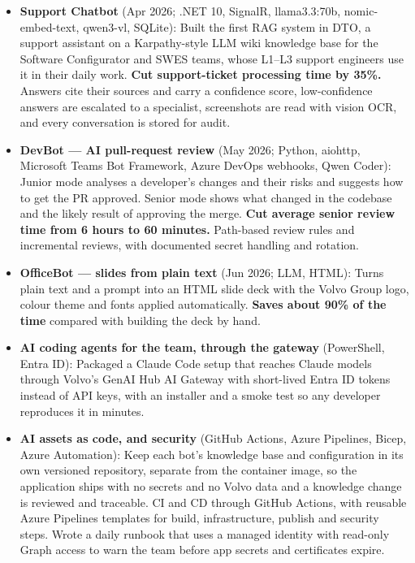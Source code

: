 \documentclass[a4paper,10pt]{article}
\begin{document}
\begin{itemize}
  \item \textbf{Support Chatbot} (Apr 2026; .NET 10, SignalR, llama3.3:70b, nomic-embed-text, qwen3-vl, SQLite): Built the first RAG system in DTO, a support assistant on a Karpathy-style LLM wiki knowledge base for the Software Configurator and SWES teams, whose L1--L3 support engineers use it in their daily work. \textbf{Cut support-ticket processing time by 35\%.} Answers cite their sources and carry a confidence score, low-confidence answers are escalated to a specialist, screenshots are read with vision OCR, and every conversation is stored for audit.

  \item \textbf{DevBot --- AI pull-request review} (May 2026; Python, aiohttp, Microsoft Teams Bot Framework, Azure DevOps webhooks, Qwen Coder): Junior mode analyses a developer's changes and their risks and suggests how to get the PR approved. Senior mode shows what changed in the codebase and the likely result of approving the merge. \textbf{Cut average senior review time from 6 hours to 60 minutes.} Path-based review rules and incremental reviews, with documented secret handling and rotation.

  \item \textbf{OfficeBot --- slides from plain text} (Jun 2026; LLM, HTML): Turns plain text and a prompt into an HTML slide deck with the Volvo Group logo, colour theme and fonts applied automatically. \textbf{Saves about 90\% of the time} compared with building the deck by hand.

  \item \textbf{AI coding agents for the team, through the gateway} (PowerShell, Entra ID): Packaged a Claude Code setup that reaches Claude models through Volvo's GenAI Hub AI Gateway with short-lived Entra ID tokens instead of API keys, with an installer and a smoke test so any developer reproduces it in minutes.

  \item \textbf{AI assets as code, and security} (GitHub Actions, Azure Pipelines, Bicep, Azure Automation): Keep each bot's knowledge base and configuration in its own versioned repository, separate from the container image, so the application ships with no secrets and no Volvo data and a knowledge change is reviewed and traceable. CI and CD through GitHub Actions, with reusable Azure Pipelines templates for build, infrastructure, publish and security steps. Wrote a daily runbook that uses a managed identity with read-only Graph access to warn the team before app secrets and certificates expire.


\end{itemize}
\end{document}
